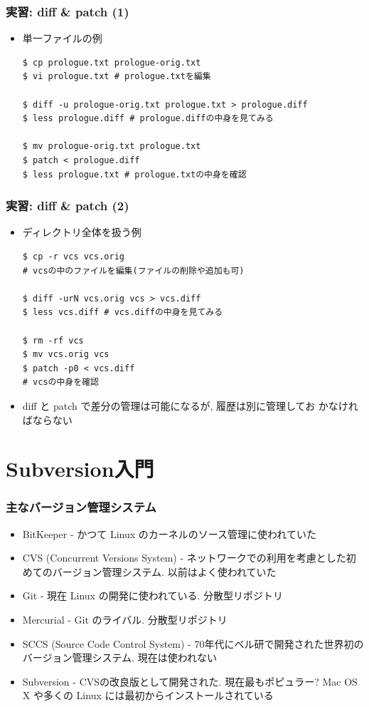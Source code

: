 \documentclass[10pt,dvipdfmx]{beamer}
\begin{document}
\begin{frame}[t,fragile]
  \frametitle{実習: diff \& patch (1)}
  \begin{itemize}
  \item 単一ファイルの例
\begin{lstlisting}
$ cp prologue.txt prologue-orig.txt
$ vi prologue.txt # prologue.txtを編集

$ diff -u prologue-orig.txt prologue.txt > prologue.diff
$ less prologue.diff # prologue.diffの中身を見てみる

$ mv prologue-orig.txt prologue.txt
$ patch < prologue.diff
$ less prologue.txt # prologue.txtの中身を確認
\end{lstlisting}
  \end{itemize}
\end{frame}

\begin{frame}[t,fragile]
  \frametitle{実習: diff \& patch (2)}
  \begin{itemize}
  \item ディレクトリ全体を扱う例
\begin{lstlisting}
$ cp -r vcs vcs.orig
# vcsの中のファイルを編集(ファイルの削除や追加も可)

$ diff -urN vcs.orig vcs > vcs.diff
$ less vcs.diff # vcs.diffの中身を見てみる

$ rm -rf vcs
$ mv vcs.orig vcs
$ patch -p0 < vcs.diff
# vcsの中身を確認
\end{lstlisting}
  \item diff と patch で差分の管理は可能になるが, 履歴は別に管理してお
    かなければならない
  \end{itemize}
\end{frame}

\section{Subversion入門}

\begin{frame}
  \frametitle{主なバージョン管理システム}
  \begin{itemize}
  \item BitKeeper - かつて Linux のカーネルのソース管理に使われていた
  \item CVS (Concurrent Versions System) - ネットワークでの利用を考慮とした初めてのバージョン管理システム. 以前はよく使われていた
  \item Git - 現在 Linux の開発に使われている. 分散型リポジトリ
  \item Mercurial - Git のライバル. 分散型リポジトリ
  \item SCCS (Source Code Control System) - 70年代にベル研で開発された世界初のバージョン管理システム. 現在は使われない
  \item {\color{red}Subversion} - CVSの改良版として開発された. 現在最もポピュラー? Mac OS X や多くの Linux には最初からインストールされている
  \end{itemize}
\end{frame}
\end{document}
